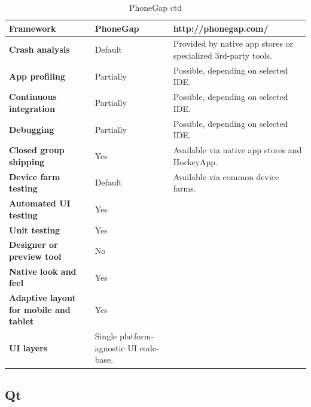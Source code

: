 \documentclass[english,master,public,dept460,male,cpdeclaration,oneside]{diploma}
\begin{document}
\begin{table}[!h]
	\centering
	\caption{PhoneGap ctd}
	\begin{tabular}{p{} | p{} | p{}}
		\toprule		
		\textbf{Framework} & \textbf{PhoneGap} & http://phonegap.com/ \\
		\midrule
		\textbf{Crash analysis} & Default & Provided by native app stores or specialized 3rd-party tools. \\			
		\midrule
		\textbf{App profiling} & Partially & Possible, depending on selected IDE. \\			
		\midrule
		\textbf{Continuous integration} & Partially & Possible, depending on selected IDE. \\			
		\midrule
		\textbf{Debugging} & Partially & Possible, depending on selected IDE. \\			
		\midrule
		\textbf{Closed group shipping} & Yes & Available via native app stores and HockeyApp. \\			
		\midrule
		\textbf{Device farm testing} & Default & Available via common device farms. \\			
		\midrule
		\textbf{Automated UI testing} & Yes & \\			
		\midrule
		\textbf{Unit testing} & Yes & \\			
		\midrule
		\textbf{Designer or preview tool} & No & \\			
		\midrule
		\textbf{Native look and feel} & Yes & \\			
		\midrule
		\textbf{Adaptive layout for mobile and tablet} & Yes & \\			
		\midrule		
		\textbf{UI layers} & Single platform-agnostic UI code-base. &  \\			
		\midrule
	\end{tabular}
\end{table}

\clearpage
\subsection{Qt}
\end{document}
